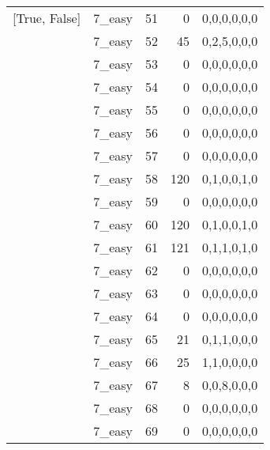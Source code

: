 \begin{tabular}{llrrl}
 [True, False]   & 7\_easy              &            51 &                     0 & 0,0,0,0,0,0   \\
 [True, False]   & 7\_easy              &            52 &                    45 & 0,2,5,0,0,0   \\
 [True, False]   & 7\_easy              &            53 &                     0 & 0,0,0,0,0,0   \\
 [True, False]   & 7\_easy              &            54 &                     0 & 0,0,0,0,0,0   \\
 [True, False]   & 7\_easy              &            55 &                     0 & 0,0,0,0,0,0   \\
 [True, False]   & 7\_easy              &            56 &                     0 & 0,0,0,0,0,0   \\
 [True, False]   & 7\_easy              &            57 &                     0 & 0,0,0,0,0,0   \\
 [True, False]   & 7\_easy              &            58 &                   120 & 0,1,0,0,1,0   \\
 [True, False]   & 7\_easy              &            59 &                     0 & 0,0,0,0,0,0   \\
 [True, False]   & 7\_easy              &            60 &                   120 & 0,1,0,0,1,0   \\
 [True, False]   & 7\_easy              &            61 &                   121 & 0,1,1,0,1,0   \\
 [True, False]   & 7\_easy              &            62 &                     0 & 0,0,0,0,0,0   \\
 [True, False]   & 7\_easy              &            63 &                     0 & 0,0,0,0,0,0   \\
 [True, False]   & 7\_easy              &            64 &                     0 & 0,0,0,0,0,0   \\
 [True, False]   & 7\_easy              &            65 &                    21 & 0,1,1,0,0,0   \\
 [True, False]   & 7\_easy              &            66 &                    25 & 1,1,0,0,0,0   \\
 [True, False]   & 7\_easy              &            67 &                     8 & 0,0,8,0,0,0   \\
 [True, False]   & 7\_easy              &            68 &                     0 & 0,0,0,0,0,0   \\
 [True, False]   & 7\_easy              &            69 &                     0 & 0,0,0,0,0,0   \\

\end{tabular}
